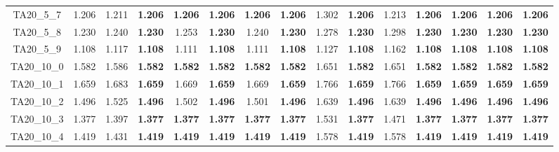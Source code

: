 \begin{tabular}{cc||ccccccccccccc}
TA20\_5\_7         & 1.206            & 1.211            & {\bf 1.206}      & {\bf 1.206}      & {\bf 1.206}      & {\bf 1.206}      & {\bf 1.206}      & 1.302            & {\bf 1.206}      & 1.213            & {\bf 1.206}      & {\bf 1.206}      & {\bf 1.206}      & {\bf 1.206}     \\ 
TA20\_5\_8         & 1.230            & 1.240            & {\bf 1.230}      & 1.253            & {\bf 1.230}      & 1.240            & {\bf 1.230}      & 1.278            & {\bf 1.230}      & 1.298            & {\bf 1.230}      & {\bf 1.230}      & {\bf 1.230}      & {\bf 1.230}     \\ 
TA20\_5\_9         & 1.108            & 1.117            & {\bf 1.108}      & 1.111            & {\bf 1.108}      & 1.111            & {\bf 1.108}      & 1.127            & {\bf 1.108}      & 1.162            & {\bf 1.108}      & {\bf 1.108}      & {\bf 1.108}      & {\bf 1.108}     \\ 
TA20\_10\_0        & 1.582            & 1.586            & {\bf 1.582}      & {\bf 1.582}      & {\bf 1.582}      & {\bf 1.582}      & {\bf 1.582}      & 1.651            & {\bf 1.582}      & 1.651            & {\bf 1.582}      & {\bf 1.582}      & {\bf 1.582}      & {\bf 1.582}     \\ 
TA20\_10\_1        & 1.659            & 1.683            & {\bf 1.659}      & 1.669            & {\bf 1.659}      & 1.669            & {\bf 1.659}      & 1.766            & {\bf 1.659}      & 1.766            & {\bf 1.659}      & {\bf 1.659}      & {\bf 1.659}      & {\bf 1.659}     \\ 
TA20\_10\_2        & 1.496            & 1.525            & {\bf 1.496}      & 1.502            & {\bf 1.496}      & 1.501            & {\bf 1.496}      & 1.639            & {\bf 1.496}      & 1.639            & {\bf 1.496}      & {\bf 1.496}      & {\bf 1.496}      & {\bf 1.496}     \\ 
TA20\_10\_3        & 1.377            & 1.397            & {\bf 1.377}      & {\bf 1.377}      & {\bf 1.377}      & {\bf 1.377}      & {\bf 1.377}      & 1.531            & {\bf 1.377}      & 1.471            & {\bf 1.377}      & {\bf 1.377}      & {\bf 1.377}      & {\bf 1.377}     \\ 
TA20\_10\_4        & 1.419            & 1.431            & {\bf 1.419}      & {\bf 1.419}      & {\bf 1.419}      & {\bf 1.419}      & {\bf 1.419}      & 1.578            & {\bf 1.419}      & 1.578            & {\bf 1.419}      & {\bf 1.419}      & {\bf 1.419}      & {\bf 1.419}     \\ 

\end{tabular}
